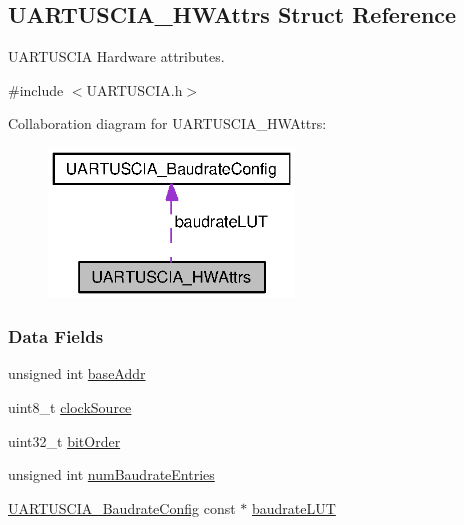 \subsection{U\+A\+R\+T\+U\+S\+C\+I\+A\+\_\+\+H\+W\+Attrs Struct Reference}
\label{struct_u_a_r_t_u_s_c_i_a___h_w_attrs}


U\+A\+R\+T\+U\+S\+C\+I\+A Hardware attributes.  




{\ttfamily \#include $<$U\+A\+R\+T\+U\+S\+C\+I\+A.\+h$>$}



Collaboration diagram for U\+A\+R\+T\+U\+S\+C\+I\+A\+\_\+\+H\+W\+Attrs\+:
\nopagebreak
\begin{figure}[H]
\begin{center}
\leavevmode
\includegraphics[width=185pt]{struct_u_a_r_t_u_s_c_i_a___h_w_attrs__coll__graph}
\end{center}
\end{figure}
\subsubsection*{Data Fields}
\begin{DoxyCompactItemize}
\item 
unsigned int \hyperlink{struct_u_a_r_t_u_s_c_i_a___h_w_attrs_aceece5625f03db035c4602c1f67e8038}{base\+Addr}
\item 
uint8\+\_\+t \hyperlink{struct_u_a_r_t_u_s_c_i_a___h_w_attrs_a4aec72a0ebaedd4a4972448aa01a2250}{clock\+Source}
\item 
uint32\+\_\+t \hyperlink{struct_u_a_r_t_u_s_c_i_a___h_w_attrs_ac37864896a2d13ca7989076a125f1bd0}{bit\+Order}
\item 
unsigned int \hyperlink{struct_u_a_r_t_u_s_c_i_a___h_w_attrs_ae73e37878acb0ca3f0c5b4209af6dc55}{num\+Baudrate\+Entries}
\item 
\hyperlink{struct_u_a_r_t_u_s_c_i_a___baudrate_config}{U\+A\+R\+T\+U\+S\+C\+I\+A\+\_\+\+Baudrate\+Config} const $\ast$ \hyperlink{struct_u_a_r_t_u_s_c_i_a___h_w_attrs_a5c2588fa1527626c8c6711f825cc96bd}{baudrate\+L\+U\+T}
\end{DoxyCompactItemize}


